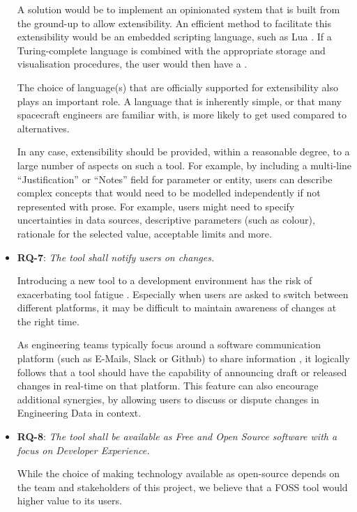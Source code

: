 \documentclass[]{iac}
\def\todo#1{}
\begin{document}
\begin{itemize}[itemsep=6pt]
    A \todo{middle-ground} solution would be to implement an opinionated system that is built from the ground-up to allow extensibility. An efficient method to facilitate this extensibility would be an embedded scripting language, such as Lua \todo{or the other language I recently starred}. If a Turing-complete language is combined with the appropriate storage and visualisation procedures, the user would then have a \todo{theoretically infinite canvas}.

    The choice of language(s) that are officially supported for extensibility also plays an important role. A language that is inherently simple, or that many spacecraft engineers are familiar with, is more likely to get used compared to alternatives.

    In any case, extensibility should be provided, within a reasonable degree, to a large number of aspects on such a tool. For example, by including a multi-line ``Justification'' or ``Notes'' field for parameter or entity, users can describe complex concepts that would need to be modelled independently if not represented with prose. For example, users might need to specify uncertainties in data sources, descriptive parameters (such as colour), rationale for the selected value, acceptable limits and more.

    \item \textbf{RQ-7}: \emph{The tool shall notify users on changes.}

    Introducing a new tool to a development environment has the risk of exacerbating tool fatigue \todo{find a reference that explains what tool fatigue even is or if such a thing exists}. Especially when users are asked to switch between different platforms, it may be difficult to maintain awareness of changes at the right time.

    As engineering teams typically focus around a software communication platform (such as E-Mails, Slack or Github) to share information \autocite{honore-livermore_managing_2021,retselis_adaptation_2022}, it logically follows that a tool should have the capability of announcing draft or released changes in real-time on that platform. This feature can also encourage additional synergies, by allowing users to discuss or dispute changes in Engineering Data in context.

    \item \textbf{RQ-8}: \emph{The tool shall be available as Free and Open Source software with a focus on Developer Experience.}

    While the choice of making technology available as open-source depends on the team and stakeholders of this project, we believe that a \acs{FOSS} tool would \todo{present} higher value to its users.%


\end{itemize}
\end{document}
